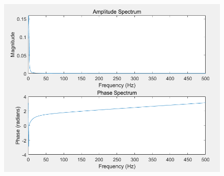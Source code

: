\documentclass{article}
\begin{document}
            \begin{figure}[h]
                \includegraphics{63_1.png}
            \end{figure}
            \FloatBarrier
\end{document}
